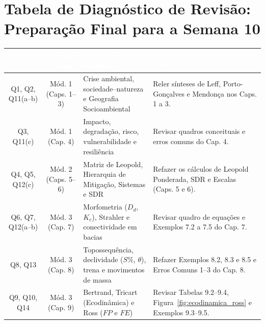 \section*{Tabela de Diagnóstico de Revisão: Preparação Final para a Semana 10}

\begin{center}
\renewcommand{\arraystretch}{1.22}
\small
\begin{tabularx}{\textwidth}{@{}c c p{4.3cm} >{\raggedright\arraybackslash}X@{}}
  \toprule
  \rowcolor{uefsNavy}
  \textcolor{white}{\bfseries Questão} & \textcolor{white}{\bfseries Módulo / Cap.} & \textcolor{white}{\bfseries Conteúdo Avaliado} & \textcolor{white}{\bfseries Ação Corretiva de Revisão} \\
  \midrule
  Q1, Q2, Q11(a--b) & Mód. 1 (Caps. 1--3) & Crise ambiental, sociedade--natureza e Geografia Socioambiental & Reler sínteses de Leff, Porto-Gonçalves e Mendonça nos Caps. 1 a 3. \\
  \rowcolor{bgGray}
  Q3, Q11(c) & Mód. 1 (Cap. 4) & Impacto, degradação, risco, vulnerabilidade e resiliência & Revisar quadros conceituais e erros comuns do Cap. 4. \\
  Q4, Q5, Q12(c) & Mód. 2 (Caps. 5--6) & Matriz de Leopold, Hierarquia de Mitigação, Sistemas e SDR & Refazer os cálculos de Leopold Ponderada, SDR e Escalas (Caps. 5 e 6). \\
  \rowcolor{bgGray}
  Q6, Q7, Q12(a--b) & Mód. 3 (Cap. 7) & Morfometria ($D_d$, $K_c$), Strahler e conectividade em bacias & Revisar quadro de equações e Exemplos 7.2 a 7.5 do Cap. 7. \\
  Q8, Q13 & Mód. 3 (Cap. 8) & Topossequência, declividade ($S\%$, $\theta$), trena e movimentos de massa & Refazer Exemplos 8.2, 8.3 e 8.5 e Erros Comuns 1--3 do Cap. 8. \\
  \rowcolor{bgGray}
  Q9, Q10, Q14 & Mód. 3 (Cap. 9) & Bertrand, Tricart (Ecodinâmica) e Ross ($FP$ e $FE$) & Revisar Tabelas 9.2--9.4, Figura~\ref{fig:ecodinamica_ross} e Exemplos 9.3--9.5. \\
  \bottomrule
\end{tabularx}
\end{center}
